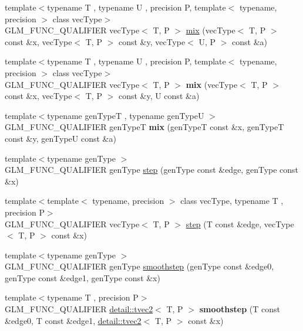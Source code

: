 \begin{DoxyCompactItemize}
\item 
{\footnotesize template$<$typename T , typename U , precision P, template$<$ typename, precision $>$ class vec\+Type$>$ }\\G\+L\+M\+\_\+\+F\+U\+N\+C\+\_\+\+Q\+U\+A\+L\+I\+F\+I\+ER vec\+Type$<$ T, P $>$ \hyperlink{group__core__func__common_gadccbaffe46f369cf1a96b2aef92cbfdd}{mix} (vec\+Type$<$ T, P $>$ const \&x, vec\+Type$<$ T, P $>$ const \&y, vec\+Type$<$ U, P $>$ const \&a)
\item 
{\footnotesize template$<$typename T , typename U , precision P, template$<$ typename, precision $>$ class vec\+Type$>$ }\\G\+L\+M\+\_\+\+F\+U\+N\+C\+\_\+\+Q\+U\+A\+L\+I\+F\+I\+ER vec\+Type$<$ T, P $>$ {\bfseries mix} (vec\+Type$<$ T, P $>$ const \&x, vec\+Type$<$ T, P $>$ const \&y, U const \&a)
\item 
{\footnotesize template$<$typename gen\+TypeT , typename gen\+TypeU $>$ }\\G\+L\+M\+\_\+\+F\+U\+N\+C\+\_\+\+Q\+U\+A\+L\+I\+F\+I\+ER gen\+TypeT {\bfseries mix} (gen\+TypeT const \&x, gen\+TypeT const \&y, gen\+TypeU const \&a)
\item 
{\footnotesize template$<$typename gen\+Type $>$ }\\G\+L\+M\+\_\+\+F\+U\+N\+C\+\_\+\+Q\+U\+A\+L\+I\+F\+I\+ER gen\+Type \hyperlink{group__core__func__common_gaf21c84759af7799f573865f70c2f0a86}{step} (gen\+Type const \&edge, gen\+Type const \&x)
\item 
{\footnotesize template$<$template$<$ typename, precision $>$ class vec\+Type, typename T , precision P$>$ }\\G\+L\+M\+\_\+\+F\+U\+N\+C\+\_\+\+Q\+U\+A\+L\+I\+F\+I\+ER vec\+Type$<$ T, P $>$ \hyperlink{group__core__func__common_gae830a682901c0ba63c92a7d201bba007}{step} (T const \&edge, vec\+Type$<$ T, P $>$ const \&x)
\item 
{\footnotesize template$<$typename gen\+Type $>$ }\\G\+L\+M\+\_\+\+F\+U\+N\+C\+\_\+\+Q\+U\+A\+L\+I\+F\+I\+ER gen\+Type \hyperlink{group__core__func__common_ga754103c8d2cdaf40f71429252457c10a}{smoothstep} (gen\+Type const \&edge0, gen\+Type const \&edge1, gen\+Type const \&x)
\item 
{\footnotesize template$<$typename T , precision P$>$ }\\G\+L\+M\+\_\+\+F\+U\+N\+C\+\_\+\+Q\+U\+A\+L\+I\+F\+I\+ER \hyperlink{structglm_1_1detail_1_1tvec2}{detail\+::tvec2}$<$ T, P $>$ {\bfseries smoothstep} (T const \&edge0, T const \&edge1, \hyperlink{structglm_1_1detail_1_1tvec2}{detail\+::tvec2}$<$ T, P $>$ const \&x)\hypertarget{namespaceglm_a87db22e4254b9f56eaafefb7cfb72a13}{}\label{namespaceglm_a87db22e4254b9f56eaafefb7cfb72a13}


\end{DoxyCompactItemize}
